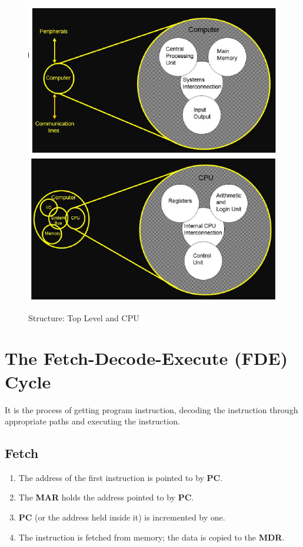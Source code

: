 \documentclass[9pt,twocolumn]{article}
\begin{document}
    \begin{figure}[h!]
      \centering
      \includegraphics[scale=0.5]{./assets/001/struct-top.png}
      \includegraphics[scale=0.5]{./assets/001/struct-cpu.png}
      \caption{Structure: Top Level and CPU}
    \end{figure}

\section*{The Fetch-Decode-Execute (FDE) Cycle}
  It is the process of getting program instruction, decoding the instruction through appropriate paths and executing the instruction.

  \subsection*{Fetch}
    \begin{enumerate}
      \item The address of the first instruction is pointed to by \textbf{PC}.
      \item The \textbf{MAR} holds the address pointed to by \textbf{PC}.
      \item \textbf{PC} (or the address held inside it) is incremented by one.
      \item The instruction is fetched from memory; the data is copied to the \textbf{MDR}.
    \end{enumerate}
\end{document}
